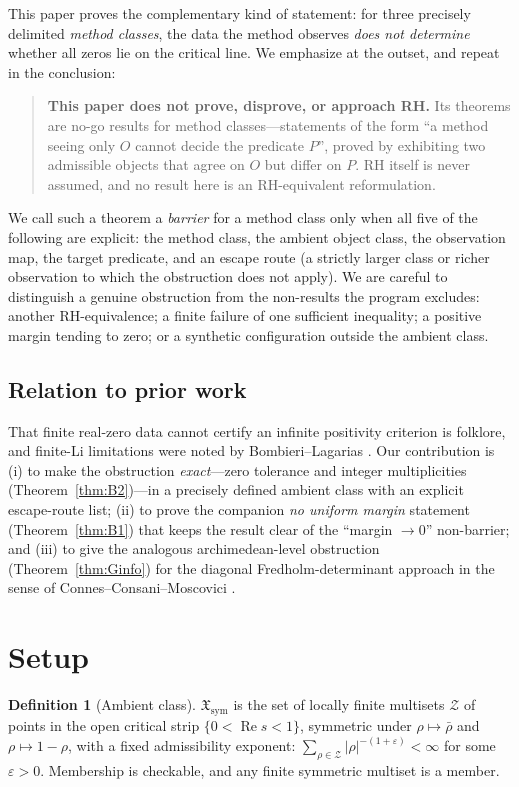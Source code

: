 \documentclass[11pt]{article}
\theoremstyle{plain}
\theoremstyle{definition}
\newtheorem{definition}{Definition}
\theoremstyle{remark}
\newcommand{\Xsym}{\mathfrak{X}_{\mathrm{sym}}}
\begin{document}
This paper proves the complementary kind of statement: for three precisely delimited
\emph{method classes}, the data the method observes \emph{does not determine} whether all zeros
lie on the critical line. We emphasize at the outset, and repeat in the conclusion:
\begin{quote}
\textbf{This paper does not prove, disprove, or approach RH.} Its theorems are no-go results
for method classes---statements of the form ``a method seeing only $O$ cannot decide the
predicate $P$'', proved by exhibiting two admissible objects that agree on $O$ but differ on
$P$. RH itself is never assumed, and no result here is an RH-equivalent reformulation.
\end{quote}
We call such a theorem a \emph{barrier} for a method class only when all five of the following
are explicit: the method class, the ambient object class, the observation map, the target
predicate, and an escape route (a strictly larger class or richer observation to which the
obstruction does not apply). We are careful to distinguish a genuine obstruction from the
non-results the program excludes: another RH-equivalence; a finite failure of one sufficient
inequality; a positive margin tending to zero; or a synthetic configuration outside the
ambient class.

\subsection{Relation to prior work}
That finite real-zero data cannot certify an infinite positivity criterion is folklore, and
finite-Li limitations were noted by Bombieri--Lagarias \cite{BombieriLagarias1999}. Our
contribution is (i) to make the obstruction \emph{exact}---zero tolerance and integer
multiplicities (Theorem~\ref{thm:B2})---in a precisely defined ambient class with an explicit
escape-route list; (ii) to prove the companion \emph{no uniform margin} statement
(Theorem~\ref{thm:B1}) that keeps the result clear of the ``margin $\to 0$'' non-barrier; and
(iii) to give the analogous archimedean-level obstruction (Theorem~\ref{thm:Ginfo}) for the
diagonal Fredholm-determinant approach in the sense of Connes--Consani--Moscovici
\cite{CCM2025}.

\section{Setup}\label{sec:setup}

\begin{definition}[Ambient class]
$\Xsym$ is the set of locally finite multisets $\mathcal{Z}$ of points in the open critical
strip $\{0<\operatorname{Re} s<1\}$, symmetric under $\rho\mapsto\bar\rho$ and $\rho\mapsto 1-\rho$, with a
fixed admissibility exponent: $\sum_{\rho\in\mathcal Z}|\rho|^{-(1+\varepsilon)}<\infty$ for
some $\varepsilon>0$. Membership is checkable, and any finite symmetric multiset is a member.
\end{definition}
\end{document}
